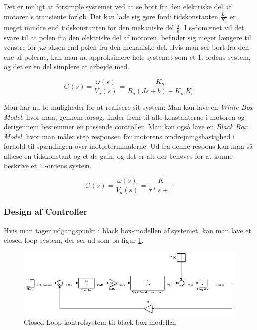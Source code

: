 Det er muligt at forsimple systemet ved at se bort fra den elektriske del af motoren's transiente forløb. Det kan lade sig gøre fordi tidskonstanten $\frac{L_{a}}{R_{a}}$ er meget mindre end tidskonstanten for den mekaniske del $\frac{J}{b}$. I s-domænet vil det svare til at polen fra den elektriske del af motoren, befinder sig meget længere til venstre for $j\omega$-aksen end polen fra den mekaniske del. Hvis man ser bort fra den ene af polerne, kan man nu approksimere hele systemet som et 1.-ordens system, og det er en del simplere at arbejde med.

\begin{equation}
G(s)=\dfrac{\omega(s)}{V_{a}(s)}=\dfrac{K_{m}}{R_{a}(Js+b)+K_{m}K_{e}}
\end{equation}

Man har nu to muligheder for at realisere sit system: Man kan lave en \textit{White Box Model}, hvor man, gennem forsøg, finder frem til alle konstanterne i motoren og derigennem bestemmer en passende controller. Man kan også lave en \textit{Black Box Model}, hvor man måler step responsen for motorens omdrejningshastighed i forhold til spændingen over motorterminalerne. Ud fra denne respons kan man så aflæse en tidskonstant og et dc-gain, og det er alt der behøves for at kunne beskrive et 1.-ordens system.

\begin{equation}
G(s)=\dfrac{\omega(s)}{V_{a}(s)}=\dfrac{K}{\tau*s+1}
\end{equation}

\subsubsection{Design af Controller}

Hvis man tager udgangspunkt i black box-modellen af systemet, kan man lave et closed-loop-system, der ser ud som på figur \ref{fig:BB_Model}. 

\begin{figure}[ht]
	\begin{center}
		\includegraphics[scale=0.7]{Billeder/BB_Model.PNG}
	\end{center}
\caption{Closed-Loop kontrolsystem til black box-modellen}
\label{fig:BB_Model}
\end{figure}

